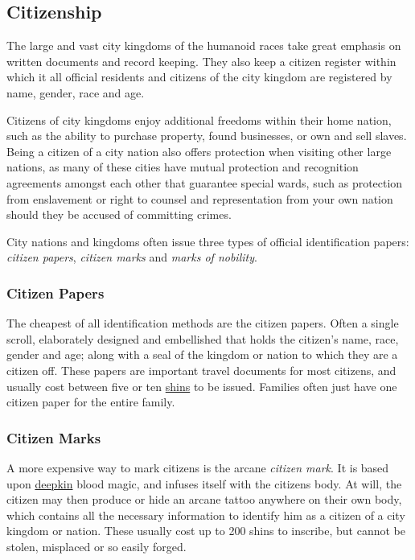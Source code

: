 \subsection{Citizenship}
\label{sec:Citizenship}

The large and vast city kingdoms of the humanoid races take great emphasis
on written documents and record keeping. They also keep a citizen register
within which it all official residents and citizens of the city kingdom are
registered by name, gender, race and age.

Citizens of city kingdoms enjoy additional freedoms within their home nation,
such as the ability to purchase property, found businesses, or own and sell
slaves. Being a citizen of a city nation also offers protection when visiting
other large nations, as many of these cities have mutual protection and
recognition agreements amongst each other that guarantee special wards, such
as protection from enslavement or right to counsel and representation from your
own nation should they be accused of committing crimes.

City nations and kingdoms often issue three types of official identification
papers: \emph{citizen papers}, \emph{citizen marks} and
\emph{marks of nobility}.

\subsubsection{Citizen Papers}
\label{sec:Citizen Papers}

The cheapest of all identification methods are the citizen papers. Often a
single scroll, elaborately designed and embellished that holds the citizen's
name, race, gender and age; along with a seal of the kingdom or nation to
which they are a citizen off. These papers are important travel documents for
most citizens, and usually cost between five or ten \hyperref[sec:Shin]{shins}
to be issued. Families often just have one citizen paper for the entire family.

\subsubsection{Citizen Marks}
\label{sec:Citizen Marks}

A more expensive way to mark citizens is the arcane \emph{citizen mark}. It is
based upon \hyperref[sec:Deepkin]{deepkin} blood magic, and infuses itself
with the citizens body. At will, the citizen may then produce or hide an
arcane tattoo anywhere on their own body, which contains all the necessary
information to identify him as a citizen of a city kingdom or nation. These
usually cost up to 200 shins to inscribe, but cannot be stolen, misplaced or
so easily forged.


